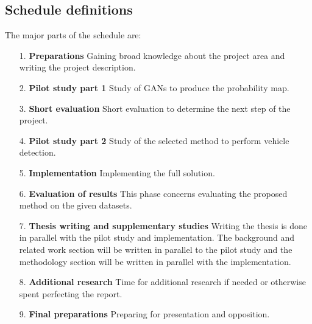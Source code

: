 \documentclass[a4paper,11pt]{article}
\begin{document}
\subsection{Schedule definitions}
The major parts of the schedule are:
\begin{enumerate}
\item[1.] \textbf{Preparations} Gaining broad knowledge about the project area and writing the project description.
\item[2.] \textbf{Pilot study part 1} Study of GANs to produce the probability map.
\item[3.] \textbf{Short evaluation} Short evaluation to determine the next step of the project.
\item[4.] \textbf{Pilot study part 2} Study of the selected method to perform vehicle detection.
\item[5.] \textbf{Implementation} Implementing the full solution.
\item[6.] \textbf{Evaluation of results} This phase concerns evaluating the proposed method on the given datasets. 
\item[7.] \textbf{Thesis writing and supplementary studies} Writing the thesis is done in parallel with the pilot study and implementation. The background and related work section will be written in parallel to the pilot study and the methodology section will be written in parallel with the implementation.
\item[8.] \textbf{Additional research} Time for additional research if needed or otherwise spent perfecting the report.
\item[9.] \textbf{Final preparations} Preparing for presentation and opposition.
\end{enumerate}
\newpage


\end{document}
